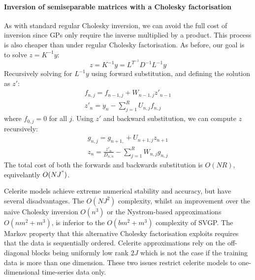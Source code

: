 \paragraph{Inversion of semiseparable matrices with a Cholesky factorisation}
As with standard regular Cholesky inversion, we can avoid the full cost of inversion since GPs only require the inverse multiplied by a product. This process is also cheaper than under regular Cholesky factorisation. As before, our goal is to solve $z = K^{-1} y$:
\begin{equation*}
    z = K^{-1} y = L^{T^{-1}} D^{-1} L^{-1} y
\end{equation*}
Recursively solving for $L^{-1} y$ using forward substitution, and defining the solution as $z'$:
\begin{equation*}
    \begin{aligned}
        f_{n,j} = f_{n-1,j} + W_{n-1,j} z'_{n-1} \\
        z'_n = y_n - \sum_{j=1}^{R} U_{n,j} f_{n,j}
    \end{aligned}
\end{equation*}
where $f_{0,j} = 0$ for all $j$. Using $z'$ and backward substitution, we can compute $z$ recursively:
\begin{equation*}
    \begin{aligned}
        g_{n,j} = g_{n+1,} + U_{n+1,j} z_{n+1} \\
        z_n = \frac{z'_n}{D_{n,n}} - \sum_{j=1}^R W_{n,j} g_{n,j}
    \end{aligned}
\end{equation*}
The total cost of both the forwards and backwards substitution is $O(N R)$, equivelantly $O(N J^")$.

Celerite models achieve extreme numerical stability and accuracy, but have several disadvantages. The $O(N J^2)$ complexity, whilst an improvement over the naive Cholesky inversion $O(n^3)$ or the Nystrom-based approximations $O(nm^2 + m^3)$, is inferior to the $O(bm^2 + m^3)$ complexity of SVGP. The Markov property that this alternative Cholesky factorisation exploits requires that the data is sequentially ordered. Celerite approximations rely on the off-diagonal blocks being uniformly low rank $2J$ which is not the case if the training data is more than one dimension. These two issues restrict celerite models to one-dimensional time-series data only.

% 
% 
% 
% 
% 
